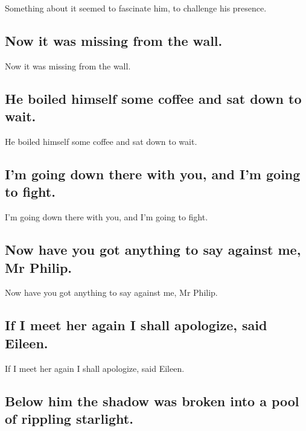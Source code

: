 \documentclass[]{article}
\begin{document}
Something about it seemed to fascinate him, to challenge his presence.

\hypertarget{now-it-was-missing-from-the-wall.}{%
\subsection{Now it was missing from the
wall.}\label{now-it-was-missing-from-the-wall.}}

Now it was missing from the wall.

\hypertarget{he-boiled-himself-some-coffee-and-sat-down-to-wait.}{%
\subsection{He boiled himself some coffee and sat down to
wait.}\label{he-boiled-himself-some-coffee-and-sat-down-to-wait.}}

He boiled himself some coffee and sat down to wait.

\hypertarget{im-going-down-there-with-you-and-im-going-to-fight.}{%
\subsection{I'm going down there with you, and I'm going to
fight.}\label{im-going-down-there-with-you-and-im-going-to-fight.}}

I'm going down there with you, and I'm going to fight.

\hypertarget{now-have-you-got-anything-to-say-against-me-mr-philip.}{%
\subsection{Now have you got anything to say against me, Mr
Philip.}\label{now-have-you-got-anything-to-say-against-me-mr-philip.}}

Now have you got anything to say against me, Mr Philip.

\hypertarget{if-i-meet-her-again-i-shall-apologize-said-eileen.}{%
\subsection{If I meet her again I shall apologize, said
Eileen.}\label{if-i-meet-her-again-i-shall-apologize-said-eileen.}}

If I meet her again I shall apologize, said Eileen.

\hypertarget{below-him-the-shadow-was-broken-into-a-pool-of-rippling-starlight.}{%
\subsection{Below him the shadow was broken into a pool of rippling
starlight.}\label{below-him-the-shadow-was-broken-into-a-pool-of-rippling-starlight.}}
\end{document}
